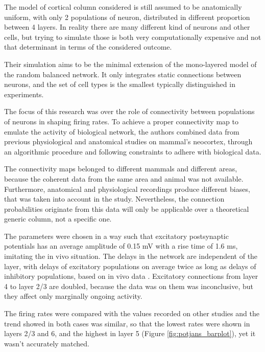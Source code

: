 The model of cortical column considered is still assumed to be anatomically uniform, with only 2 populations of neuron, distributed in different proportion between 4 layers. In reality there are many different kind of neurons and other cells, but trying to simulate those is both very computationally expensive and not that determinant in terms of the considered outcome.

Their simulation aims to be the minimal extension of the mono-layered model of the random balanced network. It only integrates static connections between neurons, and the set of cell types is the smallest typically distinguished in experiments.

The focus of this research was over the role of connectivity between populations of neurons in shaping firing rates. To achieve a proper connectivity map to emulate the activity of biological network, the authors \cite{potjans} combined data from previous physiological and anatomical studies on mammal's neocortex, through an algorithmic procedure and following constraints to adhere with biological data. 

The connectivity maps belonged to different mammals and different areas, because the coherent data from the same area and animal was not available. Furthermore, anatomical and physiological recordings produce different biases, that was taken into account in the study.
Nevertheless, the connection probabilities originate from this data will only be applicable over a theoretical generic column, not a specific one. 

The parameters were chosen in a way such that excitatory postsynaptic potentials has an average amplitude of 0.15 mV with a rise time of 1.6 ms, imitating the in vivo situation. The delays in the network are independent of the layer, with delays of excitatory populations on average twice as long as delays of inhibitory populations, based on in vivo data \cite{thomson2003interlaminar}. Excitatory connections from layer 4 to layer 2/3 are doubled, because the data was on them was inconclusive, but they affect only marginally ongoing activity.

The firing rates were compared with the values recorded on other studies \cite{kock} and the trend showed in both cases was similar, so that the lowest rates were shown in layers 2/3 and 6, and the highest in layer 5 (Figure \ref{fig:potjans_barplot}), yet it wasn't accurately matched. 

